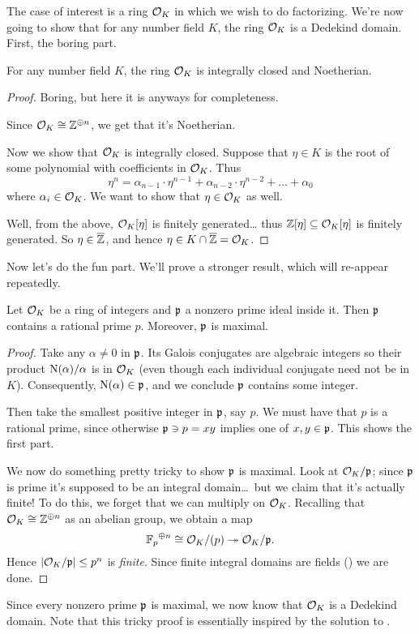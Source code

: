 The case of interest is a ring $\mathcal O_K$ in which we wish to do factorizing.
We're now going to show that for any number field $K$, the ring $\mathcal O_K$ is a Dedekind domain.
First, the boring part.
\begin{proposition}
	For any number field $K$, the ring $\mathcal O_K$ is integrally closed and Noetherian.
\end{proposition}
\begin{proof}
	Boring, but here it is anyways for completeness.

	Since $\mathcal O_K \cong \mathbb Z^{\oplus n}$, we get that it's Noetherian.

	Now we show that $\mathcal O_K$ is integrally closed.
	Suppose that $\eta \in K$ is the root of some polynomial with coefficients in $\mathcal O_K$.
	Thus
	\[ \eta^n = \alpha_{n-1} \cdot \eta^{n-1} + \alpha_{n-2} \cdot \eta^{n-2}
		+ \dots + \alpha_0 \] 
	where $\alpha_i \in \mathcal O_K$. We want to show that $\eta \in \mathcal O_K$ as well.

	Well, from the above, $\mathcal O_K[\eta]$ is finitely generated\dots
	thus $\mathbb Z[\eta] \subseteq \mathcal O_K[\eta]$ is finitely generated.
	So $\eta \in \overline{\mathbb Z}$, and hence $\eta \in K \cap \overline{\mathbb Z} = \mathcal O_K$.
\end{proof}
Now let's do the fun part.
We'll prove a stronger result, which will re-appear repeatedly.
\begin{theorem}
	Let $\mathcal O_K$ be a ring of integers
	and $\mathfrak p$ a nonzero prime ideal inside it.
	Then $\mathfrak p$ contains a rational prime $p$.
	Moreover, $\mathfrak p$ is maximal.
\end{theorem}
\begin{proof}
	Take any $\alpha \neq 0$ in $\mathfrak p$.
	Its Galois conjugates are algebraic integers
	so their product $\operatorname{N}(\alpha)/\alpha$ is in $\mathcal O_K$
	(even though each individual conjugate need not be in $K$).
	Consequently, $\operatorname{N}(\alpha) \in \mathfrak p$,
	and we conclude $\mathfrak p$ contains some integer.

	Then take the smallest positive integer in $\mathfrak p$, say $p$.
	We must have that $p$ is a rational prime, since otherwise $\mathfrak p \ni p = xy$
	implies one of $x,y \in \mathfrak p$.
	This shows the first part.

	We now do something pretty tricky to show $\mathfrak p$ is maximal.
	Look at $\mathcal O_K / \mathfrak p$;
	since $\mathfrak p$ is prime it's supposed to be an integral domain\dots\ 
	but we claim that it's actually finite!
	To do this, we forget that we can multiply on $\mathcal O_K$.
	Recalling that $\mathcal O_K \cong \mathbb Z^{\oplus n}$ as an abelian group,
	we obtain a map
	\[ {\mathbb F_p}^{\oplus n} \cong \mathcal O_K / (p) \twoheadrightarrow \mathcal O_K / \mathfrak p. \]
	Hence $\left\lvert \mathcal O_K / \mathfrak p \right\rvert \le p^n$ is \emph{finite}.
	Since finite integral domains are fields ()
	we are done.
\end{proof}
Since every nonzero prime $\mathfrak p$ is maximal, we now know that $\mathcal O_K$ is a Dedekind domain.
Note that this tricky proof is essentially inspired by the solution to .


